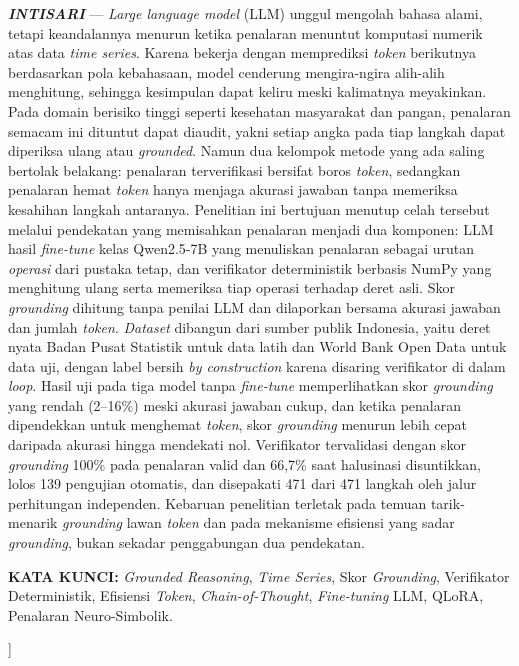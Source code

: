 \documentclass[10pt,a4paper,twocolumn]{article}
\begin{document}
{\begin{@twocolumnfalse}
{\small\justifying
\noindent\textbf{\textit{INTISARI}} --- \textit{Large language model} (LLM)
unggul mengolah bahasa alami, tetapi keandalannya menurun ketika penalaran
menuntut komputasi numerik atas data \textit{time series}. Karena bekerja dengan
memprediksi \textit{token} berikutnya berdasarkan pola kebahasaan, model
cenderung mengira-ngira alih-alih menghitung, sehingga kesimpulan dapat keliru
meski kalimatnya meyakinkan. Pada domain berisiko tinggi seperti kesehatan
masyarakat dan pangan, penalaran semacam ini dituntut dapat diaudit, yakni setiap
angka pada tiap langkah dapat diperiksa ulang atau \textit{grounded}. Namun dua
kelompok metode yang ada saling bertolak belakang: penalaran terverifikasi
bersifat boros \textit{token}, sedangkan penalaran hemat \textit{token} hanya
menjaga akurasi jawaban tanpa memeriksa kesahihan langkah antaranya. Penelitian
ini bertujuan menutup celah tersebut melalui pendekatan yang memisahkan penalaran
menjadi dua komponen: LLM hasil \textit{fine-tune} kelas Qwen2.5-7B yang
menuliskan penalaran sebagai urutan \textit{operasi} dari pustaka tetap, dan
verifikator deterministik berbasis NumPy yang menghitung ulang serta memeriksa
tiap operasi terhadap deret asli. Skor \textit{grounding} dihitung tanpa penilai
LLM dan dilaporkan bersama akurasi jawaban dan jumlah \textit{token}.
\textit{Dataset} dibangun dari sumber publik Indonesia, yaitu deret nyata Badan
Pusat Statistik untuk data latih dan World Bank Open Data untuk data uji, dengan
label bersih \textit{by construction} karena disaring verifikator di dalam
\textit{loop}. Hasil uji pada tiga model tanpa \textit{fine-tune} memperlihatkan
skor \textit{grounding} yang rendah (2--16\%) meski akurasi jawaban cukup, dan
ketika penalaran dipendekkan untuk menghemat \textit{token}, skor
\textit{grounding} menurun lebih cepat daripada akurasi hingga mendekati nol.
Verifikator tervalidasi dengan skor \textit{grounding} 100\% pada penalaran valid
dan 66,7\% saat halusinasi disuntikkan, lolos 139 pengujian otomatis, dan
disepakati 471 dari 471 langkah oleh jalur perhitungan independen. Kebaruan
penelitian terletak pada temuan tarik-menarik \textit{grounding} lawan
\textit{token} dan pada mekanisme efisiensi yang sadar \textit{grounding}, bukan
sekadar penggabungan dua pendekatan.
\par\vspace{0.7em}
\noindent\textbf{KATA KUNCI:} \textit{Grounded Reasoning}, \textit{Time Series},
Skor \textit{Grounding}, Verifikator Deterministik, Efisiensi \textit{Token},
\textit{Chain-of-Thought}, \textit{Fine-tuning} LLM, QLoRA, Penalaran
Neuro-Simbolik.
\par}
\vspace{0.6em}
\end{@twocolumnfalse}
}]
\end{document}
